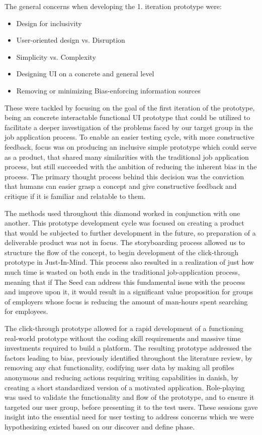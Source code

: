 The general concerns when developing the 1. iteration prototype were:
\begin{itemize}
    \item Design for inclusivity
    \item User-oriented design vs. Disruption
    \item Simplicity vs. Complexity
    \item Designing UI on a concrete and general level
    \item Removing or minimizing Bias-enforcing information sources
\end{itemize}
These were tackled by focusing on the goal of the first iteration of the prototype, being an concrete interactable functional UI prototype that could be utilized to facilitate a deeper investigation of the problems faced by our target group in the job application process. To enable an easier testing cycle, with more constructive feedback, focus was on producing an inclusive simple prototype which could serve as a product, that shared many similarities with the traditional job application process, but still succeeded with the ambition of reducing the inherent bias in the process. The primary thought process behind this decision was the conviction that humans can easier grasp a concept and give constructive feedback and critique if it is familiar and relatable to them. 

The methods used throughout this diamond worked in conjunction with one another. This prototype development cycle was focused on creating a product that would be subjected to further development in the future, so preparation of a deliverable product was not in focus. The storyboarding process allowed us to structure the flow of the concept, to begin development of the click-through prototype in Just-In-Mind. This process also resulted in a realization of just how much time is wasted on both ends in the traditional job-application process, meaning that if The Seed can address this fundamental issue with the process and improve upon it, it would result in a significant value proposition for groups of employers whose focus is reducing the amount of man-hours spent searching for employees. 

The click-through prototype allowed for a rapid development of a functioning real-world prototype without the coding skill requirements and massive time investments required to build a platform. The resulting prototype addressed the factors leading to bias, previously identified throughout the literature review, by removing any chat functionality, codifying user data by making all profiles anonymous and reducing actions requiring writing capabilities in danish, by creating a short standardized version of a motivated application. Role-playing was used to validate the functionality and flow of the prototype, and to ensure it targeted our user group, before presenting it to the test users. These sessions gave insight into the essential need for user testing to address concerns which we were hypothesizing existed based on our discover and define phase.

